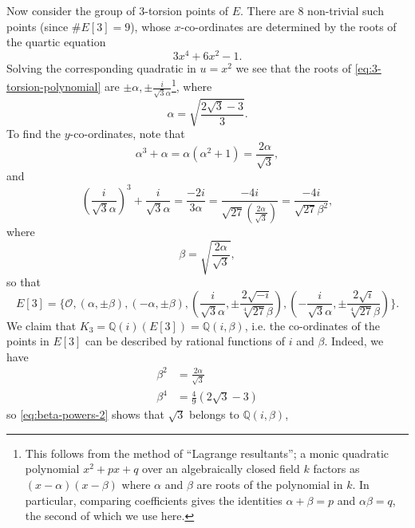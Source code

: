 Now consider the group of $3$-torsion points of $E$.  There are $8$ non-trivial such
points (since $ \# E[3] = 9$), whose $x$-co-ordinates are determined by the roots of
the quartic equation
\begin{equation}
  \label{eq:3-torsion-polynomial}
  3x^{4} + 6x^{2} - 1.
\end{equation}
Solving the corresponding quadratic in $u = x^{2}$ we see that the roots of
\eqref{eq:3-torsion-polynomial} are $\pm \alpha, \pm
\frac{i}{\sqrt{3}\alpha}$\footnote{This follows from the method of ``Lagrange
  resultants''; a monic quadratic polynomial $x^{2} + px + q$ over an algebraically
  closed field $k$ factors as $(x - \alpha)(x - \beta)$ where $\alpha$ and $\beta$
  are roots of the polynomial in $k$. In particular, comparing coefficients gives the
  identities $\alpha + \beta = p$ and $\alpha \beta = q$, the second of which we use
  here.}, where
\begin{equation*}
  \alpha = \sqrt{ \frac{2\sqrt{3} - 3}{3} }.
\end{equation*}
To find the $y$-co-ordinates, note that
\begin{equation*}
  \alpha^{3} + \alpha = \alpha(\alpha^{2} + 1) = \frac{2\alpha}{\sqrt{3}},
\end{equation*}
and
\begin{equation*}
  (\frac{i}{\sqrt{3}\alpha})^{3} + \frac{i}{\sqrt{3}\alpha} = \frac{-2i}{3\alpha} =
  \frac{-4i}{\sqrt{27} (\frac{2\alpha}{\sqrt{3}}) } = \frac{-4i}{\sqrt{27}\beta^{2}},
\end{equation*}
where
\begin{equation*}
  \beta = \sqrt{ \frac{2\alpha}{\sqrt{3}} },
\end{equation*}
so that
\begin{equation}
  \label{eq:points-of-e[3]}
  E[3] = \{ \mathcal{O}, (\alpha,\pm \beta), (-\alpha, \pm \beta),
  (\frac{i}{\sqrt{3}\alpha}, \pm \frac{2 \sqrt{-i}}{\sqrt[4]{27}\beta} ),
  (-\frac{i}{\sqrt{3}\alpha}, \pm \frac{2 \sqrt{i}}{\sqrt[4]{27}\beta} )  \}.
\end{equation}
We claim that $K_{3} = \mathbb{Q}(i)(E[3]) = \mathbb{Q}(i,\beta)$, i.e. the
co-ordinates of the points in $E[3]$ can be described by rational functions of $i$
and $\beta$. Indeed, we have
\begin{align}
  \beta^{2}&= \frac{2\alpha}{\sqrt{3}} \label{eq:beta-powers-1}\\
  \beta^{4}&= \frac{4}{9}(2\sqrt{3} - 3) \label{eq:beta-powers-2}
\end{align}
so \eqref{eq:beta-powers-2} shows that $\sqrt{3}$ belongs to $\mathbb{Q}(i,\beta)$,
